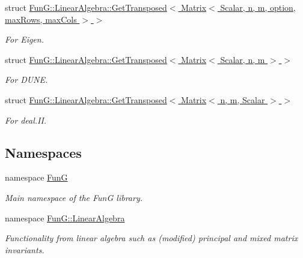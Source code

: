 \begin{DoxyCompactItemize}
struct \hyperlink{structFunG_1_1LinearAlgebra_1_1GetTransposed_3_01Matrix_3_01Scalar_00_01n_00_01m_00_01option_00_837706e7e2f5ff6060578b88ee4bef60}{\-Fun\-G\-::\-Linear\-Algebra\-::\-Get\-Transposed$<$ Matrix$<$ Scalar, n, m, option, max\-Rows, max\-Cols $>$ $>$}
\begin{DoxyCompactList}\small\item\em \-For \-Eigen. \end{DoxyCompactList}\item 
struct \hyperlink{structFunG_1_1LinearAlgebra_1_1GetTransposed_3_01Matrix_3_01Scalar_00_01n_00_01m_01_4_01_4}{\-Fun\-G\-::\-Linear\-Algebra\-::\-Get\-Transposed$<$ Matrix$<$ Scalar, n, m $>$ $>$}
\begin{DoxyCompactList}\small\item\em \-For \-D\-U\-N\-E. \end{DoxyCompactList}\item 
struct \hyperlink{structFunG_1_1LinearAlgebra_1_1GetTransposed_3_01Matrix_3_01n_00_01m_00_01Scalar_01_4_01_4}{\-Fun\-G\-::\-Linear\-Algebra\-::\-Get\-Transposed$<$ Matrix$<$ n, m, Scalar $>$ $>$}
\begin{DoxyCompactList}\small\item\em \-For deal.\-I\-I. \end{DoxyCompactList}\end{DoxyCompactItemize}
\subsection*{\-Namespaces}
\begin{DoxyCompactItemize}
\item 
namespace \hyperlink{namespaceFunG}{\-Fun\-G}
\begin{DoxyCompactList}\small\item\em \-Main namespace of the \-Fun\-G library. \end{DoxyCompactList}\item 
namespace \hyperlink{namespaceFunG_1_1LinearAlgebra}{\-Fun\-G\-::\-Linear\-Algebra}
\begin{DoxyCompactList}\small\item\em \-Functionality from linear algebra such as (modified) principal and mixed matrix invariants. \end{DoxyCompactList}\end{DoxyCompactItemize}
